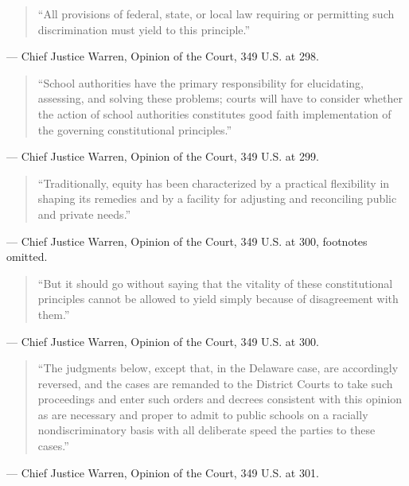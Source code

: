 \documentclass[12pt]{article}
\begin{document}
\begin{quote}
``All provisions of federal, state, or local law requiring or permitting such discrimination must yield to this principle.''
\end{quote}
\noindent --- Chief Justice Warren, Opinion of the Court, 349 U.S. at 298.

\begin{quote}
``School authorities have the primary responsibility for elucidating, assessing, and solving these problems; courts will have to consider whether the action of school authorities constitutes good faith implementation of the governing constitutional principles.''
\end{quote}
\noindent --- Chief Justice Warren, Opinion of the Court, 349 U.S. at 299.

\begin{quote}
``Traditionally, equity has been characterized by a practical flexibility in shaping its remedies and by a facility for adjusting and reconciling public and private needs.''
\end{quote}
\noindent --- Chief Justice Warren, Opinion of the Court, 349 U.S. at 300, footnotes omitted.

\begin{quote}
``But it should go without saying that the vitality of these constitutional principles cannot be allowed to yield simply because of disagreement with them.''
\end{quote}
\noindent --- Chief Justice Warren, Opinion of the Court, 349 U.S. at 300.

\begin{quote}
``The judgments below, except that, in the Delaware case, are accordingly reversed, and the cases are remanded to the District Courts to take such proceedings and enter such orders and decrees consistent with this opinion as are necessary and proper to admit to public schools on a racially nondiscriminatory basis with all deliberate speed the parties to these cases.''
\end{quote}
\noindent --- Chief Justice Warren, Opinion of the Court, 349 U.S. at 301.
\end{document}
